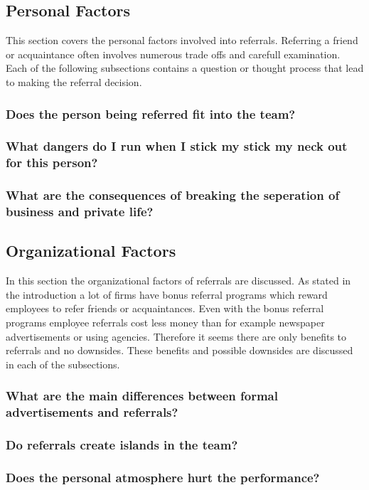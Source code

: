 \documentclass[a4paper, 11pt]{article} %
\begin{document}
\subsection*{Personal Factors}

This section covers the personal factors involved into referrals. Referring a friend or acquaintance often involves numerous trade offs and carefull examination. Each of the following subsections contains a question or thought process that lead to making the referral decision.

\subsubsection*{Does the person being referred fit into the team?}
\subsubsection*{What dangers do I run when I stick my stick my neck out for this person?}
\subsubsection*{What are the consequences of breaking the seperation of business and private life?}

\subsection*{Organizational Factors}

In this section the organizational factors of referrals are discussed. As stated in the introduction a lot of firms have bonus referral programs which reward employees to refer friends or acquaintances. Even with the bonus referral programs employee referrals cost less money than for example newspaper advertisements or using agencies. Therefore it seems there are only benefits to referrals and no downsides. These benefits and possible downsides are discussed in each of the subsections.

\subsubsection*{What are the main differences between formal advertisements and referrals?}
\subsubsection*{Do referrals create islands in the team?}
\subsubsection*{Does the personal atmosphere hurt the performance?}
\end{document}
